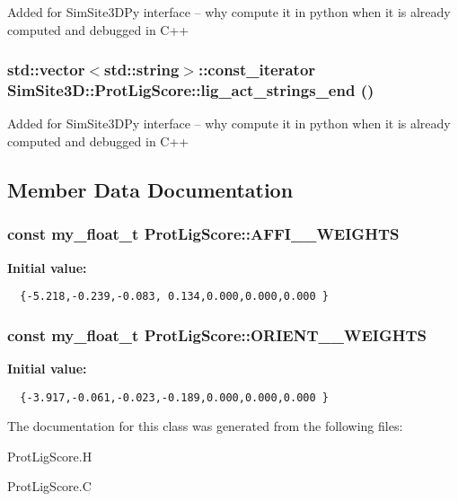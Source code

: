 Added for SimSite3D\-Py interface -- why compute it in python when it is already computed and debugged in C++ 
\subsubsection{\setlength{\rightskip}{0pt plus 5cm}std::vector$<$std::string$>$::const\_\-iterator SimSite3D::Prot\-Lig\-Score::lig\_\-act\_\-strings\_\-end ()\hspace{0.3cm}{\tt  [inline]}}\label{classSimSite3D_1_1ProtLigScore_934c0d6ca9955e06c2548020e415a1e9}


Added for SimSite3D\-Py interface -- why compute it in python when it is already computed and debugged in C++ 

\subsection{Member Data Documentation}
\subsubsection{\setlength{\rightskip}{0pt plus 5cm}const my\_\-float\_\-t Prot\-Lig\-Score::AFFI\_\_\-WEIGHTS\hspace{0.3cm}{\tt  [static, private]}}\label{classSimSite3D_1_1ProtLigScore_fed52d2f3a0f38d69cb8cfd172a0798e}


\textbf{Initial value:}

\begin{Code}\begin{verbatim} 
  {-5.218,-0.239,-0.083, 0.134,0.000,0.000,0.000 }
\end{verbatim}\end{Code}
\subsubsection{\setlength{\rightskip}{0pt plus 5cm}const my\_\-float\_\-t Prot\-Lig\-Score::ORIENT\_\_\-WEIGHTS\hspace{0.3cm}{\tt  [static, private]}}\label{classSimSite3D_1_1ProtLigScore_d03935e16ddc38eacaaad7939c38c030}


\textbf{Initial value:}

\begin{Code}\begin{verbatim} 
  {-3.917,-0.061,-0.023,-0.189,0.000,0.000,0.000 }
\end{verbatim}\end{Code}


The documentation for this class was generated from the following files:\begin{CompactItemize}
\item 
Prot\-Lig\-Score.H\item 
Prot\-Lig\-Score.C\end{CompactItemize}
